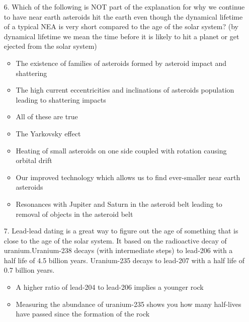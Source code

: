 \begin{enumerate}
\begin{multicols}{2}
\begin{itemize}[label={$\bullet$}]
        \item The disk of material around the sun could have had more material than the minimum mass solar nebula
    \end{itemize}\end{multicols}   
    \item[6.] Which of the following is NOT part of the explanation for why we continue to have near earth asteroids hit the earth even though the dynamical lifetime of a typical NEA is very short compared to the age of the solar system? (by dynamical lifetime we mean the time before it is likely to hit a planet or get ejected from the solar system) 
    \begin{multicols}{2} \begin{itemize}[label={$\bullet$}]
        \item The existence of families of asteroids formed by asteroid impact and shattering
        \item The high current eccentricities and inclinations of asteroids population leading to shattering impacts       
        \item All of these are true
        \item The Yarkovsky effect
        \item Heating of small asteroids on one side coupled with rotation causing orbital drift
        \item Our improved technology which allows us to find ever-smaller near earth asteroids
        \item Resonances with Jupiter and Saturn in the asteroid belt leading to removal of objects in the asteroid belt
    \end{itemize}\end{multicols}   
    \item[7.]Lead-lead dating is a great way to figure out the age of something that is close to the age of the solar system. It based on the radioactive decay of uranium.Uranium-238 decays (with intermediate steps) to lead-206 with a half life of 4.5 billion years. Uranium-235 decays to lead-207 with a half life of 0.7 billion years.
    \begin{multicols}{2} \begin{itemize}[label={$\bullet$}]
        \item A higher ratio of lead-204 to lead-206 implies a younger rock
        \item Measuring the abundance of uranium-235 shows you how many half-lives have passed since the formation of the rock

\end{itemize}
\end{multicols}
\end{enumerate}
